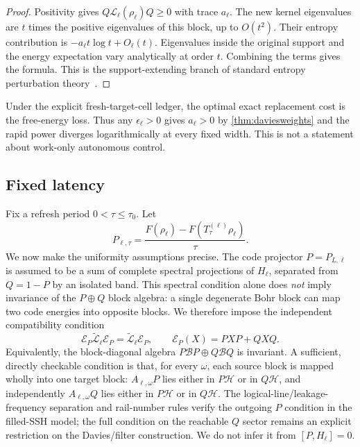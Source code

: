 \documentclass[11pt,a4paper]{article}
\theoremstyle{remark}
\newcommand{\cH}{\mathcal H}
\newcommand{\cL}{\mathcal L}
\begin{document}
\begin{proof}
Positivity gives $Q\cL_\ell(\rho_\ell)Q\ge0$ with trace $a_\ell$.  The new kernel eigenvalues are $t$ times the positive eigenvalues of this block, up to $O(t^2)$.  Their entropy contribution is $-a_\ell t\log t+O_\ell(t)$.  Eigenvalues inside the original support and the energy expectation vary analytically at order $t$.  Combining the terms gives the formula.  This is the support-extending branch of standard entropy perturbation theory~\cite{GraceGuha}.
\end{proof}

Under the explicit fresh-target-cell ledger, the optimal exact replacement cost is the free-energy loss.  Thus any $\epsilon_\ell>0$ gives $a_\ell>0$ by \cref{thm:daviesweights} and the rapid power diverges logarithmically at every fixed width.  This is not a statement about work-only autonomous control.

\subsection{Fixed latency}

Fix a refresh period $0<\tau\le\tau_0$.  Let
\[
 P_{\ell,\tau}
 =\frac{F(\rho_\ell)-F(T_\tau^{(\ell)}\rho_\ell)}{\tau}.
\]
We now make the uniformity assumptions precise.  The code projector $P=P_{L,\ell}$ is assumed to be a sum of complete spectral projections of $H_\ell$, separated from $Q=1-P$ by an isolated band.  This spectral condition alone does \emph{not} imply invariance of the $P\oplus Q$ block algebra: a single degenerate Bohr block can map two code energies into opposite blocks.  We therefore impose the independent compatibility condition
\begin{equation}\label{eq:blockcompatibility}
 \mathcal E_P\widetilde{\cL}_\ell\mathcal E_P
 =\widetilde{\cL}_\ell\mathcal E_P,
 \qquad
 \mathcal E_P(X)=PXP+QXQ.
\end{equation}
Equivalently, the block-diagonal algebra $P\mathcal B P\oplus Q\mathcal B Q$ is invariant.  A sufficient, directly checkable condition is that, for every $\omega$, each source block is mapped wholly into one target block: $A_{\ell,\omega}P$ lies either in $P\cH$ or in $Q\cH$, and independently $A_{\ell,\omega}Q$ lies either in $P\cH$ or in $Q\cH$.  The logical-line/leakage-frequency separation and rail-number rules verify the outgoing $P$ condition in the filled-SSH model; the full condition on the reachable $Q$ sector remains an explicit restriction on the Davies/filter construction.  We do not infer it from $[P,H_\ell]=0$.
\end{document}
